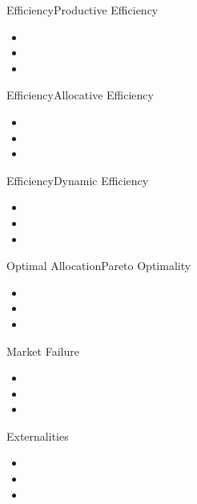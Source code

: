\documentclass[handout,xcolor=x11names,compress]{beamer}
\renewcommand{\(}{\begin{columns}}
\renewcommand{\)}{\end{columns}}
\newcommand{\<}[1]{\begin{column}{#1}}
\renewcommand{\>}{\end{column}}
\begin{document}
\begin{frame}{Efficiency}{Productive Efficiency}
\begin{itemize}[<+->]
 \item 
 \item 
 \item 
\end{itemize}
\end{frame}
\begin{frame}{Efficiency}{Allocative Efficiency}
\begin{itemize}[<+->]
 \item 
 \item 
 \item 
\end{itemize}
\end{frame}
\begin{frame}{Efficiency}{Dynamic Efficiency}
\begin{itemize}[<+->]
 \item 
 \item 
 \item 
\end{itemize}
\end{frame}
\begin{frame}{Optimal Allocation}{Pareto Optimality}
\begin{itemize}[<+->]
 \item 
 \item 
 \item 
\end{itemize}
\end{frame}
\begin{frame}{Market Failure}{}
\begin{itemize}[<+->]
 \item 
 \item 
 \item 
\end{itemize}
\end{frame}
\begin{frame}{Externalities}{}
\begin{itemize}[<+->]
 \item 
 \item 
 \item 
\end{itemize}
\end{frame}
\end{document}
